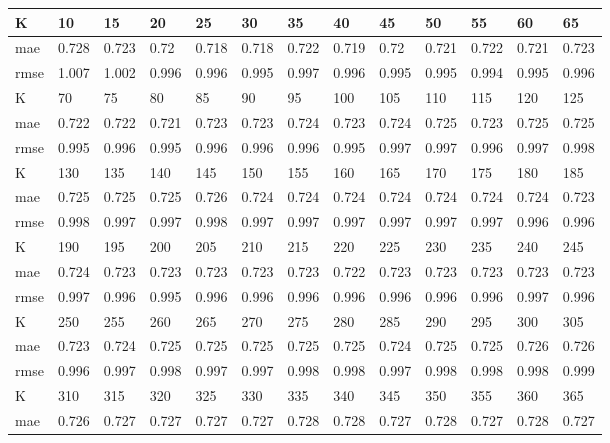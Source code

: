 \begin{appendices}
\begin{center} \label{tab16}
	\begin{tabularx}{\textwidth}{|l|X|X|X|X|X|X|X|X|X|X|X|X|} 
		\hline 
		K & 10 & 15 & 20 & 25 & 30 & 35 & 40 & 45 & 50 & 55 & 60 & 65 \\ \hline 
		mae & 0.728 & 0.723 & 0.72 & 0.718 & 0.718 & 0.722 & 0.719 & 0.72 & 0.721 & 0.722 & 0.721 & 0.723 \\ \hline 
		rmse & 1.007 & 1.002 & 0.996 & 0.996 & 0.995 & 0.997 & 0.996 & 0.995 & 0.995 & 0.994 & 0.995 & 0.996 \\ \hline 
		\hline 
		K & 70 & 75 & 80 & 85 & 90 & 95 & 100 & 105 & 110 & 115 & 120 & 125 \\ \hline 
		mae & 0.722 & 0.722 & 0.721 & 0.723 & 0.723 & 0.724 & 0.723 & 0.724 & 0.725 & 0.723 & 0.725 & 0.725 \\ \hline 
		rmse & 0.995 & 0.996 & 0.995 & 0.996 & 0.996 & 0.996 & 0.995 & 0.997 & 0.997 & 0.996 & 0.997 & 0.998 \\ \hline 
		\hline 
		K & 130 & 135 & 140 & 145 & 150 & 155 & 160 & 165 & 170 & 175 & 180 & 185 \\ \hline 
		mae & 0.725 & 0.725 & 0.725 & 0.726 & 0.724 & 0.724 & 0.724 & 0.724 & 0.724 & 0.724 & 0.724 & 0.723 \\ \hline 
		rmse & 0.998 & 0.997 & 0.997 & 0.998 & 0.997 & 0.997 & 0.997 & 0.997 & 0.997 & 0.997 & 0.996 & 0.996 \\ \hline 
		\hline 
		K & 190 & 195 & 200 & 205 & 210 & 215 & 220 & 225 & 230 & 235 & 240 & 245 \\ \hline 
		mae & 0.724 & 0.723 & 0.723 & 0.723 & 0.723 & 0.723 & 0.722 & 0.723 & 0.723 & 0.723 & 0.723 & 0.723 \\ \hline 
		rmse & 0.997 & 0.996 & 0.995 & 0.996 & 0.996 & 0.996 & 0.996 & 0.996 & 0.996 & 0.996 & 0.997 & 0.996 \\ \hline 
		\hline 
		K & 250 & 255 & 260 & 265 & 270 & 275 & 280 & 285 & 290 & 295 & 300 & 305 \\ \hline 
		mae & 0.723 & 0.724 & 0.725 & 0.725 & 0.725 & 0.725 & 0.725 & 0.724 & 0.725 & 0.725 & 0.726 & 0.726 \\ \hline 
		rmse & 0.996 & 0.997 & 0.998 & 0.997 & 0.997 & 0.998 & 0.998 & 0.997 & 0.998 & 0.998 & 0.998 & 0.999 \\ \hline 
		\hline 
		K & 310 & 315 & 320 & 325 & 330 & 335 & 340 & 345 & 350 & 355 & 360 & 365 \\ \hline 
		mae & 0.726 & 0.727 & 0.727 & 0.727 & 0.727 & 0.728 & 0.728 & 0.727 & 0.728 & 0.727 & 0.728 & 0.727 \\ \hline 

\end{tabularx}
\end{center}
\end{appendices}

